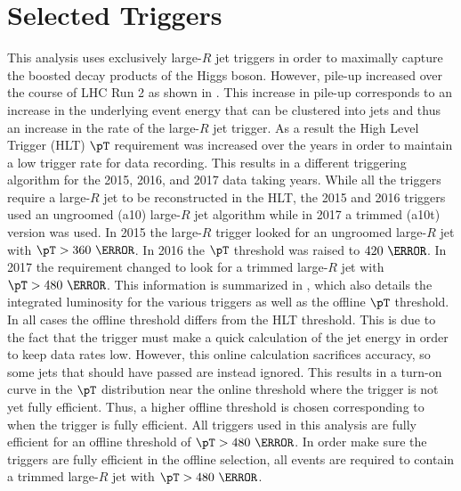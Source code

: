 \section{Selected Triggers} \label{sec:selection:triggers}

This analysis uses exclusively large-$R$ jet triggers in order to maximally
capture the boosted decay products of the Higgs boson. However, pile-up
increased over the course of LHC Run 2 as shown in . This
increase in pile-up corresponds to an increase in the underlying event energy
that can be clustered into jets and thus an increase in the rate of the
large-$R$ jet trigger. As a result the High Level Trigger (HLT) $\pT$
requirement was increased over the years in order to maintain a low trigger
rate for data recording.  This results in a different triggering algorithm for
the 2015, 2016, and 2017 data taking years.  While all the triggers require a
large-$R$ jet to be reconstructed in the HLT, the 2015 and 2016 triggers used
an ungroomed (a10) large-$R$ jet algorithm while in 2017 a trimmed (a10t)
version was used.  In 2015 the large-$R$ trigger looked for an ungroomed
large-$R$ jet with $\pT > 360~\GeV$.  In 2016 the $\pT$ threshold was raised to
$420~\GeV$.  In 2017 the requirement changed to look for a trimmed large-$R$
jet with $\pT > 480~\GeV$.  This information is summarized in
, which also details the integrated luminosity for the
various triggers as well as the offline $\pT$ threshold.  In all cases the
offline threshold differs from the HLT threshold.  This is due to the fact that
the trigger must make a quick calculation of the jet energy in order to keep
data rates low. However, this online calculation sacrifices accuracy, so some
jets that should have passed are instead ignored.  This results in a turn-on
curve in the $\pT$ distribution near the online threshold where the trigger is
not yet fully efficient. Thus, a higher offline threshold is chosen
corresponding to when the trigger is fully efficient.  All triggers used in
this analysis are fully efficient for an offline threshold of $\pT > 480~\GeV$.
In order make sure the triggers are fully efficient in the offline selection,
all events are required to contain a trimmed large-$R$ jet with $\pT >
480~\GeV$.

